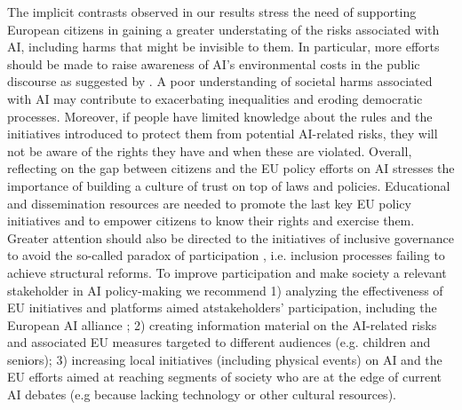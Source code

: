 \documentclass{article}
\begin{document}
 The implicit contrasts observed in our results stress the need of supporting European citizens in gaining a greater understating of the risks associated with AI, including harms that might be invisible to them. In particular, more efforts should be made to raise awareness of AI’s environmental costs in the public discourse as suggested by \cite{brevini2020black}. A poor understanding of societal harms associated with AI may contribute to exacerbating inequalities and eroding democratic processes. Moreover, if people have limited knowledge about the rules and the initiatives introduced to protect them from potential AI-related risks, they will not be aware of the rights they have and when these are violated. Overall, reflecting on the gap between citizens and the EU policy efforts on AI stresses the importance of building a culture of trust on top of laws and policies. Educational and dissemination resources are needed to promote the last key EU policy initiatives and to empower citizens to know their rights and exercise them. Greater attention should also be directed to the initiatives of inclusive governance to avoid the so-called paradox of participation \cite{cleaver1999paradoxes, png2022tensions}, i.e. inclusion processes failing to achieve structural reforms.
 To improve participation and make society a relevant stakeholder in AI policy-making we recommend 1) analyzing the effectiveness of EU initiatives and platforms aimed atstakeholders' participation, including the European AI alliance \cite{AIAlliance}; 2) creating information material on the AI-related risks and associated EU measures targeted to different audiences (e.g. children and seniors); 3) increasing local initiatives (including physical events) on AI and the EU efforts aimed at reaching segments of society who are at the edge of current AI debates (e.g because lacking technology or other cultural resources).
\end{document}
